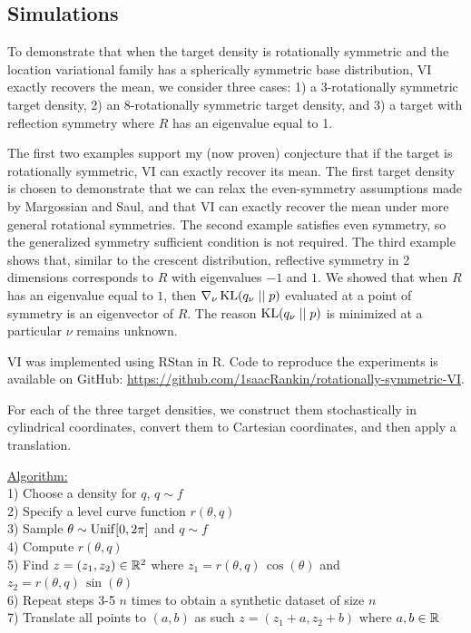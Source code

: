\documentclass{article}
\begin{document}
\subsection{Simulations}

To demonstrate that when the target density is rotationally symmetric and the location variational family has a spherically symmetric base distribution,
VI exactly recovers the mean, we consider three cases:
1) a 3-rotationally symmetric target density, 2) an 8-rotationally symmetric target density, and 3) a target with reflection symmetry where $R$ has an eigenvalue equal to 1.

The first two examples support my (now proven) conjecture that if the target is rotationally symmetric, VI can exactly recover its mean.
The first target density is chosen to demonstrate that we can relax the even-symmetry assumptions made by Margossian and Saul,
and that VI can exactly recover the mean under more general rotational symmetries.
The second example satisfies even symmetry, so the generalized symmetry sufficient condition is not required.
The third example shows that, similar to the crescent distribution, reflective symmetry in 2 dimensions corresponds to $R$ with eigenvalues $-1$ and $1$.
We showed that when $R$ has an eigenvalue equal to $1$, then $\nabla_\nu \operatorname{KL}(q_{\nu} \; || \; p)$ evaluated at a point of symmetry is an eigenvector of $R$.
The reason $\operatorname{KL}(q_{\nu} \; || \; p)$ is minimized at a particular $\nu$ remains unknown.

VI was implemented using RStan \cite{carpenter2017stan} in R.
Code to reproduce the experiments is available on GitHub:
\href{https://github.com/1saacRankin/rotationally-symmetric-VI}{https://github.com/1saacRankin/rotationally-symmetric-VI}.

For each of the three target densities, we construct them stochastically in cylindrical coordinates,
convert them to Cartesian coordinates, and then apply a translation.

\underline{Algorithm:} \\
1) Choose a density for $q$, $q \sim f$ \\
2) Specify a level curve function $r(\theta, q)$ \\
3) Sample $\theta \sim {\mathrm{Unif}}[0, 2\pi]$ and $q \sim f$ \\
4) Compute $r(\theta, q)$ \\
5) Find $z = (z_1, z_2) \in \mathbb{R}^2$ where $z_1 = r(\theta, q) \, \cos(\theta)$ and $z_2 = r(\theta, q) \, \sin(\theta)$ \\
6) Repeat steps 3-5 $n$ times to obtain a synthetic dataset of size $n$ \\
7) Translate all points to $(a, b)$ as such $z = (z_1 + a, z_2 + b)$ where $a, b \in \mathbb{R}$
\end{document}
